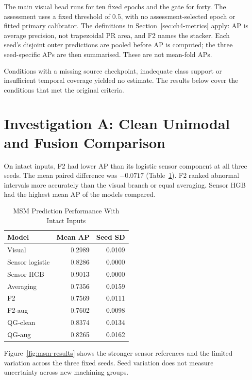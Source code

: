 The main visual head runs for ten fixed epochs and the gate for forty. The assessment
uses a fixed threshold of 0.5, with no assessment-selected epoch or fitted primary
calibrator. The definitions in Section~\ref{sec:ch4-metrics} apply: AP is average precision,
not trapezoidal PR area, and F2 names the stacker. Each seed's disjoint outer predictions
are pooled before AP is computed; the three seed-specific APs are then summarised.
These are not mean-fold APs.

Conditions with a missing source checkpoint, inadequate class support or insufficient
temporal coverage yielded no estimate. The results below cover the conditions that met
the original criteria.

\section{Investigation A: Clean Unimodal and Fusion Comparison}
\label{sec:msm-clean}
On intact inputs, F2 had lower AP than its logistic sensor component at all three seeds.
The mean paired difference was $-0.0717$ (Table~\ref{tab:msm-clean}). F2 ranked
abnormal intervals more accurately than the visual branch or equal averaging. Sensor HGB
had the highest mean AP of the models compared.

\begin{table}[htbp]
\caption{MSM Prediction Performance With Intact Inputs}\label{tab:msm-clean}
\centering\small

\begin{tabular}{lrr}\toprule Model&Mean AP&Seed SD\\\midrule
Visual&0.2989&0.0109\\
Sensor logistic&0.8286&0.0000\\
Sensor HGB&0.9013&0.0000\\
Averaging&0.7356&0.0159\\
F2&0.7569&0.0111\\
F2-aug&0.7602&0.0098\\
QG-clean&0.8374&0.0134\\
QG-aug&0.8265&0.0162\\\bottomrule
\end{tabular}
\end{table}

Figure~\ref{fig:msm-results} shows the stronger sensor references and the limited variation across the three fixed seeds. Seed variation does not measure uncertainty across new machining groups.

